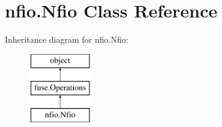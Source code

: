 \hypertarget{classnfio_1_1Nfio}{\section{nfio.\-Nfio Class Reference}
\label{classnfio_1_1Nfio}
}
Inheritance diagram for nfio.\-Nfio\-:\begin{figure}[H]
\begin{center}
\leavevmode
\includegraphics[height=3.000000cm]{classnfio_1_1Nfio}
\end{center}
\end{figure}
